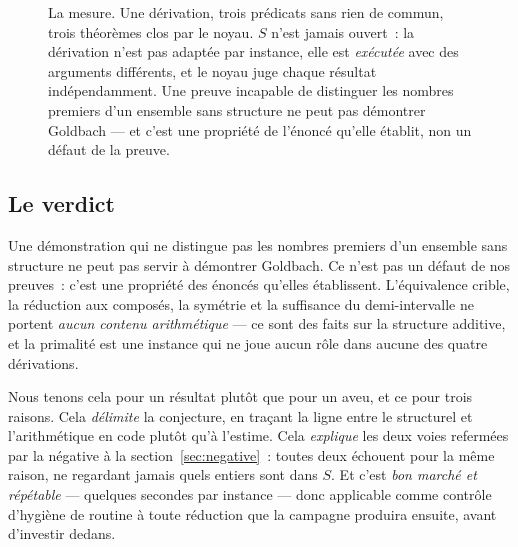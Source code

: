 \documentclass[11pt]{article}
\theoremstyle{remark}\newtheorem{remarque}{Remarque}
\begin{document}
\begin{figure}[t]
\centering
{}
\caption{La mesure. Une dérivation, trois prédicats sans rien de commun, trois théorèmes
clos par le noyau. $S$ n'est jamais ouvert~: la dérivation n'est pas adaptée par
instance, elle est \emph{exécutée} avec des arguments différents, et le noyau juge chaque
résultat indépendamment. Une preuve incapable de distinguer les nombres premiers d'un
ensemble sans structure ne peut pas démontrer Goldbach --- et c'est une propriété de
l'énoncé qu'elle établit, non un défaut de la preuve.}
\label{fig:parametric}
\end{figure}

\subsection{Le verdict}

Une démonstration qui ne distingue pas les nombres premiers d'un ensemble sans structure
ne peut pas servir à démontrer Goldbach. Ce n'est pas un défaut de nos preuves~: c'est
une propriété des énoncés qu'elles établissent. L'équivalence crible, la réduction aux
composés, la symétrie et la suffisance du demi-intervalle ne portent \emph{aucun contenu
arithmétique} --- ce sont des faits sur la structure additive, et la primalité est une
instance qui ne joue aucun rôle dans aucune des quatre dérivations.

Nous tenons cela pour un résultat plutôt que pour un aveu, et ce pour trois raisons. Cela
\emph{délimite} la conjecture, en traçant la ligne entre le structurel et l'arithmétique
en code plutôt qu'à l'estime. Cela \emph{explique} les deux voies refermées par la
négative à la section~\ref{sec:negative}~: toutes deux échouent pour la même raison, ne
regardant jamais quels entiers sont dans $S$. Et c'est \emph{bon marché et répétable} ---
quelques secondes par instance --- donc applicable comme contrôle d'hygiène de routine à
toute réduction que la campagne produira ensuite, avant d'investir dedans.
\end{document}
